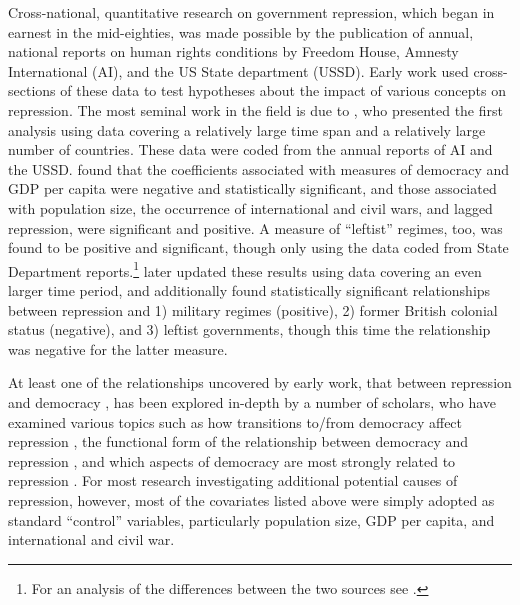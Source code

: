 \documentclass[12pt]{article}
\begin{document}
Cross-national, quantitative research on government repression, which began in earnest in the mid-eighties, was made possible by the publication of annual, national reports on human rights conditions by Freedom House, Amnesty International (AI), and the US State department (USSD). Early work used cross-sections of these data to test hypotheses about the impact of various concepts on repression. The most seminal work in the field is due to \citet{PoeTate1994}, who presented the first analysis using data covering a relatively large time span and a relatively large number of countries. These data were coded from the annual reports of AI and the USSD. \citet{PoeTate1994} found that the coefficients associated with measures of democracy and GDP per capita were negative and statistically significant, and those associated with population size, the occurrence of international and civil wars, and lagged repression, were significant and positive. A measure of ``leftist'' regimes, too, was found to be positive and significant, though only using the data coded from State Department reports.\footnote{For an analysis of the differences between the two sources see \citet{Poe2001}.} \citet{Poeetal1999} later updated these results using data covering an even larger time period, and additionally found statistically significant relationships between repression and 1) military regimes (positive), 2) former British colonial status (negative), and 3) leftist governments, though this time the relationship was negative for the latter measure. 

At least one of the relationships uncovered by early work, that between repression and democracy \citep{Henderson1991,PoeTate1994}, has been explored in-depth by a number of scholars, who have examined various topics such as how transitions to/from democracy affect repression \citep{Davenport1999}, the functional form of the relationship between democracy and repression \citep{Fein1995,DavenportArmstrong2004}, and which aspects of democracy are most strongly related to repression \citep{BDMetal2005, Davenport2007, ConradMoore2010}. For most research investigating additional potential causes of repression, however, most of the covariates listed above were simply adopted as standard ``control'' variables, particularly population size, GDP per capita, and international and civil war. 
\end{document}
